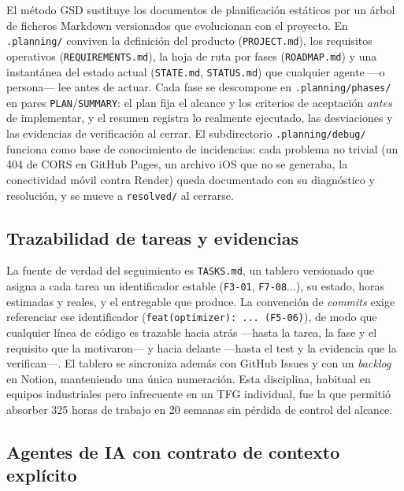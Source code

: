 El m\'etodo GSD sustituye los documentos de planificaci\'on est\'aticos por un \'arbol de
ficheros Markdown versionados que evolucionan con el proyecto. En \texttt{.planning/} conviven
la definici\'on del producto (\texttt{PROJECT.md}), los requisitos operativos
(\texttt{REQUIREMENTS.md}), la hoja de ruta por fases (\texttt{ROADMAP.md}) y una instant\'anea
del estado actual (\texttt{STATE.md}, \texttt{STATUS.md}) que cualquier agente ---o persona---
lee antes de actuar. Cada fase se descompone en \texttt{.planning/phases/} en pares
\texttt{PLAN}/\texttt{SUMMARY}: el plan fija el alcance y los criterios de aceptaci\'on
\emph{antes} de implementar, y el resumen registra lo realmente ejecutado, las desviaciones y
las evidencias de verificaci\'on al cerrar. El subdirectorio \texttt{.planning/debug/} funciona
como base de conocimiento de incidencias: cada problema no trivial (un 404 de CORS en GitHub
Pages, un archivo iOS que no se generaba, la conectividad m\'ovil contra Render) queda
documentado con su diagn\'ostico y resoluci\'on, y se mueve a \texttt{resolved/} al cerrarse.

\subsection{Trazabilidad de tareas y evidencias}

La fuente de verdad del seguimiento es \texttt{TASKS.md}, un tablero versionado que asigna a
cada tarea un identificador estable (\texttt{F3-01}, \texttt{F7-08}...), su estado, horas
estimadas y reales, y el entregable que produce. La convenci\'on de \emph{commits} exige
referenciar ese identificador (\texttt{feat(optimizer): ... (F5-06)}), de modo que cualquier
l\'inea de c\'odigo es trazable hacia atr\'as ---hasta la tarea, la fase y el requisito que la
motivaron--- y hacia delante ---hasta el test y la evidencia que la verifican---. El tablero se
sincroniza adem\'as con GitHub Issues y con un \emph{backlog} en Notion, manteniendo una
\'unica numeraci\'on. Esta disciplina, habitual en equipos industriales pero infrecuente en un
TFG individual, fue la que permiti\'o absorber 325 horas de trabajo en 20 semanas sin p\'erdida
de control del alcance.

\subsection{Agentes de IA con contrato de contexto expl\'icito}

